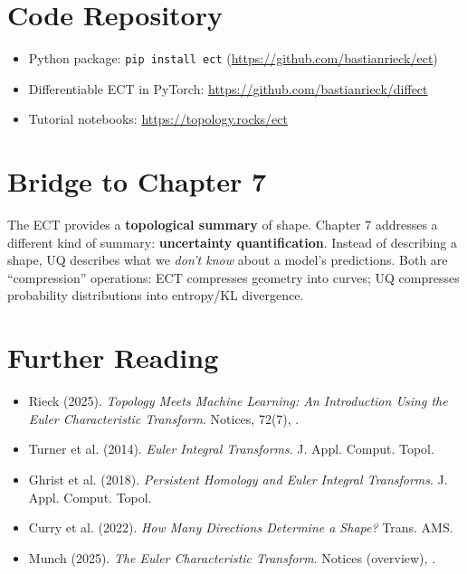 \section{Code Repository}
\label{sec:ect:repo}

\begin{itemize}
    \item Python package: \texttt{pip install ect} (\url{https://github.com/bastianrieck/ect})
    \item Differentiable ECT in PyTorch: \url{https://github.com/bastianrieck/diffect}
    \item Tutorial notebooks: \url{https://topology.rocks/ect} \cite{rieck2025topology}
\end{itemize}

\section{Bridge to Chapter 7}
\label{sec:ect:bridge}

The ECT provides a \textbf{topological summary} of shape. Chapter 7 addresses a different kind of summary: \textbf{uncertainty quantification}. Instead of describing a shape, UQ describes what we \emph{don't know} about a model's predictions. Both are ``compression'' operations: ECT compresses geometry into curves; UQ compresses probability distributions into entropy/KL divergence.

\section{Further Reading}
\label{sec:ect:refs}

\begin{itemize}
    \item Rieck (2025). \textit{Topology Meets Machine Learning: An Introduction Using the Euler Characteristic Transform}. Notices, 72(7), \cite{rieck2025topology}.
    \item Turner et al. (2014). \textit{Euler Integral Transforms}. J. Appl. Comput. Topol.
    \item Ghrist et al. (2018). \textit{Persistent Homology and Euler Integral Transforms}. J. Appl. Comput. Topol.
    \item Curry et al. (2022). \textit{How Many Directions Determine a Shape?} Trans. AMS.
    \item Munch (2025). \textit{The Euler Characteristic Transform}. Notices (overview), \cite{rieck2025topology}.
\end{itemize}

